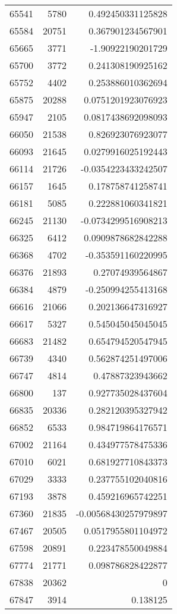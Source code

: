 \begin{tabular}{r | r | r}
65541 & 5780 & 0.492450331125828 \\
65584 & 20751 & 0.367901234567901 \\
65665 & 3771 & -1.90922190201729 \\
65700 & 3772 & 0.241308190925162 \\
65752 & 4402 & 0.253886010362694 \\
65875 & 20288 & 0.0751201923076923 \\
65947 & 2105 & 0.0817438692098093 \\
66050 & 21538 & 0.826923076923077 \\
66093 & 21645 & 0.0279916025192443 \\
66114 & 21726 & -0.0354223433242507 \\
66157 & 1645 & 0.178758741258741 \\
66181 & 5085 & 0.222881060341821 \\
66245 & 21130 & -0.0734299516908213 \\
66325 & 6412 & 0.0909878682842288 \\
66368 & 4702 & -0.353591160220995 \\
66376 & 21893 & 0.27074939564867 \\
66384 & 4879 & -0.250994255413168 \\
66616 & 21066 & 0.202136647316927 \\
66617 & 5327 & 0.545045045045045 \\
66683 & 21482 & 0.654794520547945 \\
66739 & 4340 & 0.562874251497006 \\
66747 & 4814 & 0.47887323943662 \\
66800 & 137 & 0.927735028437604 \\
66835 & 20336 & 0.282120395327942 \\
66852 & 6533 & 0.984719864176571 \\
67002 & 21164 & 0.434977578475336 \\
67010 & 6021 & 0.681927710843373 \\
67029 & 3333 & 0.237755102040816 \\
67193 & 3878 & 0.459216965742251 \\
67360 & 21835 & -0.00568430257979897 \\
67467 & 20505 & 0.0517955801104972 \\
67598 & 20891 & 0.223478550049884 \\
67774 & 21771 & 0.098786828422877 \\
67838 & 20362 & 0 \\
67847 & 3914 & 0.138125 \\

\end{tabular}

